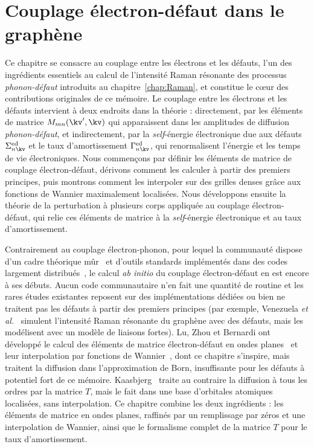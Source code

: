 \chapter{Couplage électron-défaut dans le graphène}\label{chap:défauts}
Ce chapitre se consacre au couplage entre les électrons et les défauts, l'un des ingrédients essentiels au calcul de l'intensité Raman résonante des processus \textit{phonon-défaut} introduits au chapitre~\ref{chap:Raman}, et constitue le c\oe ur des contributions originales de ce mémoire. Le couplage entre les électrons et les défauts intervient à deux endroits dans la théorie : directement, par les éléments de matrice $M_{mn}(\kv',\kv)$ qui apparaissent dans les amplitudes de diffusion \textit{phonon-défaut}, et indirectement, par la \textit{self}-énergie électronique due aux défauts $\Sigma_{n\kv}^\text{ed}$ et le taux d'amortissement $\Gamma_{n\kv}^\text{ed}$, qui renormalisent l'énergie et les temps de vie électroniques. Nous commençons par définir les éléments de matrice de couplage électron-défaut, dérivons comment les calculer à partir des premiers principes, puis montrons comment les interpoler sur des grilles denses grâce aux fonctions de Wannier maximalement localisées. Nous développons ensuite la théorie de la perturbation à plusieurs corps appliquée au couplage électron-défaut, qui relie ces éléments de matrice à la \textit{self}-énergie électronique et au taux d'amortissement.

Contrairement au couplage électron-phonon, pour lequel la communauté dispose d'un cadre théorique mûr~\cite{giustinoElectronphononInteractionsFirst2017,giustinoElectronphononInteractionUsing2007} et d'outils standards implémentés dans des codes largement distribués~\cite{ponceEPWElectronphononCoupling2016,leeElectronPhononPhysics2023a,zhouPerturboSoftwarePackage2021,gonzeAbinitProjectImpact2020,bruninPhononlimitedElectronMobility2020}, le calcul \textit{ab initio} du couplage électron-défaut en est encore à ses débuts. Aucun code communautaire n'en fait une quantité de routine et les rares études existantes reposent sur des implémentations dédiées ou bien ne traitent pas les défauts à partir des premiers principes (par exemple, Venezuela \textit{et al.}~\cite{venezuelaTheoryDoubleresonantRaman2011} simulent l'intensité Raman résonante du graphène avec des défauts, mais les modélisent avec un modèle de liaisons fortes). Lu, Zhou et Bernardi ont développé le calcul des éléments de matrice électron-défaut en ondes planes~\cite{luEfficientInitioCalculations2019} et leur interpolation par fonctions de Wannier~\cite{luInitioElectrondefectInteractions2020}, dont ce chapitre s'inspire, mais traitent la diffusion dans l'approximation de Born, insuffisante pour les défauts à potentiel fort de ce mémoire. Kaasbjerg~\cite{kaasbjergAtomisticMatrixTheory2020} traite au contraire la diffusion à tous les ordres par la matrice $T$, mais le fait dans une base d'orbitales atomiques localisées, sans interpolation. Ce chapitre combine les deux ingrédients : les éléments de matrice en ondes planes, raffinés par un remplissage par zéros et une interpolation de Wannier, ainsi que le formalisme complet de la matrice $T$ pour le taux d'amortissement.

